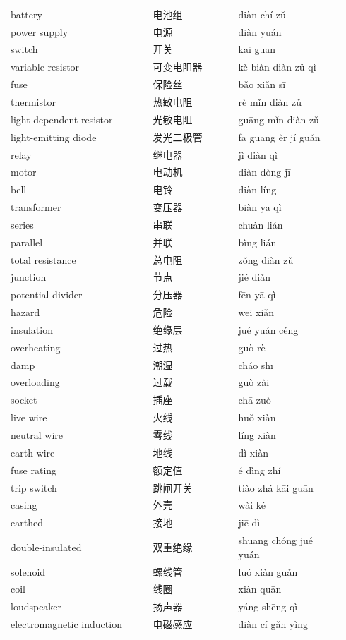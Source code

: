 \documentclass[11pt]{article}
\begin{document}
\begin{longtable}{@{}p{0.40\linewidth}p{0.24\linewidth}p{0.30\linewidth}@{}}
battery & 电池组 & diàn chí zǔ \\
power supply & 电源 & diàn yuán \\
switch & 开关 & kāi guān \\
variable resistor & 可变电阻器 & kě biàn diàn zǔ qì \\
fuse & 保险丝 & bǎo xiǎn sī \\
thermistor & 热敏电阻 & rè mǐn diàn zǔ \\
light-dependent resistor & 光敏电阻 & guāng mǐn diàn zǔ \\
light-emitting diode & 发光二极管 & fā guāng èr jí guǎn \\
relay & 继电器 & jì diàn qì \\
motor & 电动机 & diàn dòng jī \\
bell & 电铃 & diàn líng \\
transformer & 变压器 & biàn yā qì \\
series & 串联 & chuàn lián \\
parallel & 并联 & bìng lián \\
total resistance & 总电阻 & zǒng diàn zǔ \\
junction & 节点 & jié diǎn \\
potential divider & 分压器 & fēn yā qì \\
hazard & 危险 & wēi xiǎn \\
insulation & 绝缘层 & jué yuán céng \\
overheating & 过热 & guò rè \\
damp & 潮湿 & cháo shī \\
overloading & 过载 & guò zài \\
socket & 插座 & chā zuò \\
live wire & 火线 & huǒ xiàn \\
neutral wire & 零线 & líng xiàn \\
earth wire & 地线 & dì xiàn \\
fuse rating & 额定值 & é dìng zhí \\
trip switch & 跳闸开关 & tiào zhá kāi guān \\
casing & 外壳 & wài ké \\
earthed & 接地 & jiē dì \\
double-insulated & 双重绝缘 & shuāng chóng jué yuán \\
solenoid & 螺线管 & luó xiàn guǎn \\
coil & 线圈 & xiàn quān \\
loudspeaker & 扬声器 & yáng shēng qì \\
electromagnetic induction & 电磁感应 & diàn cí gǎn yìng \\

\end{longtable}
\end{document}
